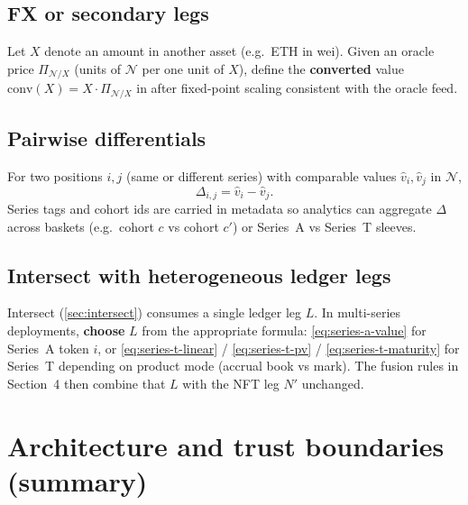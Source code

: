 \documentclass[11pt,a4paper]{article}
\newcommand{\minor}{\text{minor units}}
\begin{document}
\subsection{FX or secondary legs}

Let $X$ denote an amount in another asset (e.g.\ ETH in wei). Given an oracle price $\Pi_{\mathcal{N}/X}$ (units of $\mathcal{N}$ per one unit of $X$), define the \textbf{converted} value $\mathrm{conv}(X) = X \cdot \Pi_{\mathcal{N}/X}$ in \minor{} after fixed-point scaling consistent with the oracle feed.

\subsection{Pairwise differentials}

For two positions $i,j$ (same or different series) with comparable values $\hat{v}_i,\hat{v}_j$ in $\mathcal{N}$,
\begin{equation}
\label{eq:differential}
\Delta_{i,j} = \hat{v}_i - \hat{v}_j .
\end{equation}
Series tags and cohort ids are carried in metadata so analytics can aggregate $\Delta$ across baskets (e.g.\ cohort $c$ vs cohort $c'$) or Series~A vs Series~T sleeves.

\subsection{Intersect with heterogeneous ledger legs}

Intersect (\cref{sec:intersect}) consumes a single ledger leg $L$. In multi-series deployments, \textbf{choose} $L$ from the appropriate formula: \eqref{eq:series-a-value} for Series~A token $i$, or \eqref{eq:series-t-linear} / \eqref{eq:series-t-pv} / \eqref{eq:series-t-maturity} for Series~T depending on product mode (accrual book vs mark). The fusion rules in Section~4 then combine that $L$ with the NFT leg $N'$ unchanged.

\section{Architecture and trust boundaries (summary)}
\end{document}
